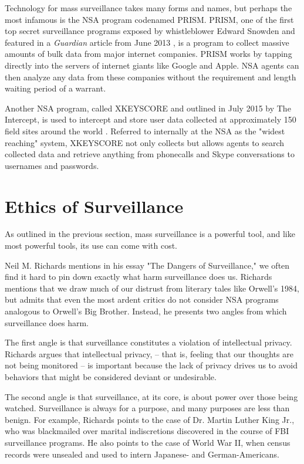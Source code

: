 \documentclass{sig-alternate-05-2015}
\begin{document}
Technology for mass surveillance takes many forms and names, but perhaps the
most infamous is the NSA program codenamed PRISM. PRISM, one of the first top
secret surveillance programs exposed by whistleblower Edward Snowden and
featured in a \textit{Guardian} article from June 2013 \cite{guardian}, is a
program to collect massive amounts of bulk data from major internet companies.
PRISM works by tapping directly into the servers of internet giants like
Google and Apple. NSA agents can then analyze any data from these companies
without the requirement and length waiting period of a warrant.

Another NSA program, called XKEYSCORE and outlined in July 2015 by The
Intercept, is used to intercept and store user data collected at  approximately
150 field sites around the world \cite{xkeyscore}. Referred to internally at
the NSA as the "widest reaching" system, XKEYSCORE not only collects but allows
agents to search collected data and retrieve anything from phonecalls and Skype
conversations to usernames and passwords.

\section{Ethics of Surveillance}

As outlined in the previous section, mass surveillance is a powerful tool, and
like most powerful tools, its use can come with cost.  

Neil M. Richards mentions in his essay "The Dangers of Surveillance,"
\cite{richards} we often find it hard to pin down exactly what harm
surveillance does us. Richards mentions that we draw much of our distrust from
literary tales like Orwell's 1984, but admits that even the most ardent critics
do not consider NSA programs analogous to Orwell's Big Brother.  Instead, he
presents two angles from which surveillance does harm. 

The first angle is that surveillance constitutes a violation of intellectual
privacy. Richards argues that intellectual privacy, -- that is, feeling that
our thoughts are not being monitored -- is important because the lack of
privacy drives us to avoid behaviors that might be considered deviant or
undesirable.

The second angle is that surveillance, at its core, is about power over those
being watched. Surveillance is always for a purpose, and many purposes are less
than benign. For example, Richards points to the case of Dr. Martin Luther King
Jr., who was blackmailed over marital indiscretions discovered in the course of
FBI surveillance programs. He also points to the case of World War II, when
census records were unsealed and used to intern Japanese- and German-Americans.
\end{document}
